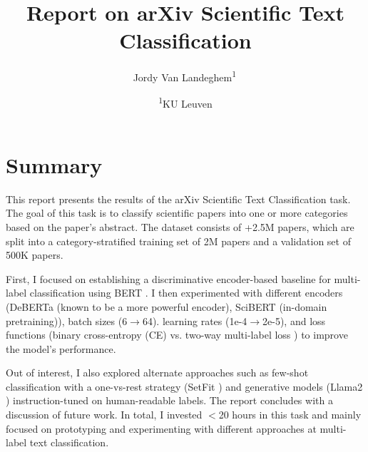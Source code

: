 \documentclass[11pt,letterpaper]{article}
\begin{document}
\title{Report on arXiv Scientific Text Classification} %

\newcommand{\superaffil}[2]{\textsuperscript{#1}\,#2}

\author{
  \small Jordy Van Landeghem\superaffil{1}
  \and
  \footnotesize{
    \textsuperscript{1}KU Leuven
  }
}

\maketitle

\section{Summary}

This report presents the results of the arXiv Scientific Text Classification task. The goal of this task is to classify scientific papers into one or more categories based on the paper's abstract. The dataset consists of +2.5M papers, which are split into a category-stratified training set of 2M papers and a validation set of 500K papers.

First, I focused on establishing a discriminative encoder-based baseline for multi-label classification using BERT \cite{devlin2018bert}.
I then experimented with different encoders (DeBERTa \cite{he2020deberta} (known to be a more powerful encoder), SciBERT \cite{maheshwari2021scibert} (in-domain pretraining)), batch sizes (6$\to$64). learning rates (1e-4$\to$2e-5), and loss functions (binary cross-entropy (CE) vs. two-way multi-label loss \cite{kobayashi2023two}) to improve the model's performance.

Out of interest, I also explored alternate approaches such as few-shot classification with a one-vs-rest strategy (SetFit \cite{tunstall2022efficient}) and generative models (Llama2 \cite{touvron2023llama}) instruction-tuned on human-readable labels. The report concludes with a discussion of future work. In total, I invested $<$20 hours in this task and mainly focused on prototyping and experimenting with different approaches at multi-label text classification.
\end{document}
